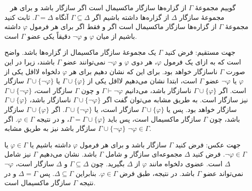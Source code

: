 ~
گوییم مجموعهٔ
$\Gamma$
از گزاره‌ها
سازگار ماکسیمال است اگر سازگار باشد و برای هر مجموعهٔ سازگار
$\Delta$
از گزاره‌ها داشته باشیم اگر
$\Gamma\subseteq\Delta$
آنگاه
$\Gamma=\Delta$. ثابت کنید مجموعهٔ
$\Gamma$
از گزاره‌ها سازگار ماکسیمال است اگر و فقط اگر برای هر فرمول
$\varphi$
داشته باشیم از میان
$\varphi$
و
$\neg\varphi$
دقیقاً یکی عضو
$\Gamma$
است.
\begin{ans}
  جهت مستقیم: فرض کنید $\Gamma$ یک مجموعهٔ سازگار ماکسیمال از گزاره‌ها باشد. واضح است که به ازای یک فرمول $\varphi$، هر دوی $\varphi$ و $\neg \varphi$ نمی‌توانند عضو $\Gamma$ باشند، زیرا در این صورت $\Gamma$ ناسازگار خواهد بود. برای این که نشان دهیم برای هر $\varphi$ دلخواه لااقل یکی از $\varphi$ یا $\neg \varphi$ عضو $\Gamma$ است، ابتدا نشان می‌دهیم لااقل یکی از $\Gamma \cup \{\varphi\}$ یا $\Gamma \cup \{\neg \varphi\}$ سازگار است. اگر $\Gamma \cup \{\varphi\}$ ناسازگار باشد، می‌دانیم $\Gamma \vdash \neg \varphi$ و چون $\Gamma$ سازگار است، $\Gamma \cup \{\neg \varphi\}$ نیز سازگار است. به طریق مشابه می‌توان گفت اگر $\Gamma \cup \{\neg \varphi\}$ ناسازگار باشد، $\Gamma \cup \{\varphi\}$ سازگار خواهد بود. پس یا $\Gamma \cup \{\varphi\}$ سازگار است، یا $\Gamma \cup \{\neg \varphi\}$. اگر $\Gamma \cup \{\varphi\}$ سازگار باشد، چون $\Gamma$ سازگار ماکسیمال است، پس باید $\Gamma = \Gamma \cup \{\varphi\}$، و در نتیجه $\varphi \in \Gamma$. اگر $\Gamma \cup \{\neg \varphi\}$ سازگار باشد نیز به طریق مشابه $\neg \varphi \in \Gamma$.

  جهت عکس: فرض کنید $\Gamma$ سازگار باشد و برای هر فرمول $\varphi$ داشته باشیم یا $\varphi \in \Gamma$ یا $\neg \varphi \in \Gamma$. فرض کنید $\Delta$ مجموعه‌ای سازگار و شامل $\Gamma$ باشد. نشان می‌دهیم $\Gamma$ نیز شامل $\Delta$ است. عضوی دلخواه مانند $\varphi$ از $\Delta$ بگیرید. چون $\Gamma \subseteq \Delta$ و $\Delta$ سازگار است، $\neg \varphi$ نمی‌تواند عضو $\Gamma$ باشد. در نتیجه، طبق فرض $\varphi \in \Gamma$. بنابراین $\Delta \subseteq \Gamma$. پس $\Delta = \Gamma$ و در نتیجه $\Gamma$ سازگار ماکسیمال است.
\end{ans}
